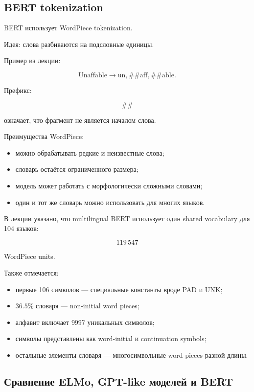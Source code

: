 \documentclass[a4paper,12pt]{article}
\begin{document}
\subsection{BERT tokenization}

BERT использует WordPiece tokenization.

Идея: слова разбиваются на подсловные единицы.

Пример из лекции:

\[
\text{Unaffable}
\rightarrow
\text{un}, \text{\#\#aff}, \text{\#\#able}.
\]

Префикс:

\[
\text{\#\#}
\]

означает, что фрагмент не является началом слова.

Преимущества WordPiece:

\begin{itemize}
    \item можно обрабатывать редкие и неизвестные слова;
    \item словарь остаётся ограниченного размера;
    \item модель может работать с морфологически сложными словами;
    \item один и тот же словарь можно использовать для многих языков.
\end{itemize}

В лекции указано, что multilingual BERT использует один shared vocabulary для 104 языков:

\[
119\,547
\]

WordPiece units.

Также отмечается:

\begin{itemize}
    \item первые 106 символов --- специальные константы вроде PAD и UNK;
    \item \(36.5\%\) словаря --- non-initial word pieces;
    \item алфавит включает \(9997\) уникальных символов;
    \item символы представлены как word-initial и continuation symbols;
    \item остальные элементы словаря --- многосимвольные word pieces разной длины.
\end{itemize}

\subsection{Сравнение ELMo, GPT-like моделей и BERT}
\end{document}
